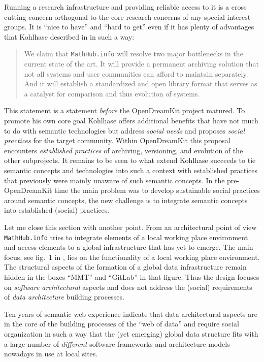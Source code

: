 \documentclass{llncs}
\begin{document}
Running a research infrastructure and providing reliable access to it is a
cross cutting concern \cite{ccc} orthogonal to the core research concerns of
any special interest groups. It is ``nice to have'' and ``hard to get'' even
if it has plenty of advantages that Kohlhase described in \cite{mathhub} in
such a way:
\begin{quote}
  We claim that \texttt{MathHub.info} will resolve two major bottlenecks in the
  current state of the art. It will provide a permanent archiving solution that
  not all systems and user communities can afford to maintain separately. And
  it will establish a standardized and open library format that serves as a
  catalyst for comparison and thus evolution of systems.
\end{quote}
This statement is a statement \emph{before} the OpenDreamKit project matured.
To promote his own core goal Kohlhase offers additional benefits that have not
much to do with semantic technologies but address \emph{social needs} and
proposes \emph{social practices} for the target community.  Within OpenDreamKit
this proposal encounters \emph{established practices} of archiving, versioning,
and evolution of the other subprojects. It remains to be seen to what extend
Kohlhase succeeds to tie semantic concepts and technologies into such a context
with established practices that previously were mainly unaware of such semantic
concepts.  In the pre-OpenDreamKit time the main problem was to develop
sustainable social practices around semantic concepts, the new challenge is to
integrate semantic concepts into established (social) practices. 
\medskip

Let me close this section with another point. From an architectural point of
view \texttt{MathHub.info} tries to integrate elements of a local working place
environment and access elements to a global infrastructure that has yet to
emerge. The main focus, see fig.~1 in \cite{mathhub}, lies on the functionality
of a local working place environment.  The structural aspects of the formation
of a global data infra\-structure remain hidden in the boxes ``MMT'' and
``GitLab'' in that figure. Thus the design focuses on \emph{software
  architectural} aspects and does not address the (social) requirements of
\emph{data architecture} building processes.

Ten years of semantic web experience indicate that data architectural aspects
are in the core of the building processes of the ``web of data'' and require
social organization in such a way that the (yet emerging) global data structure
fits with a large number of \emph{different} software frameworks and
architecture models nowadays in use at local sites.
\end{document}
